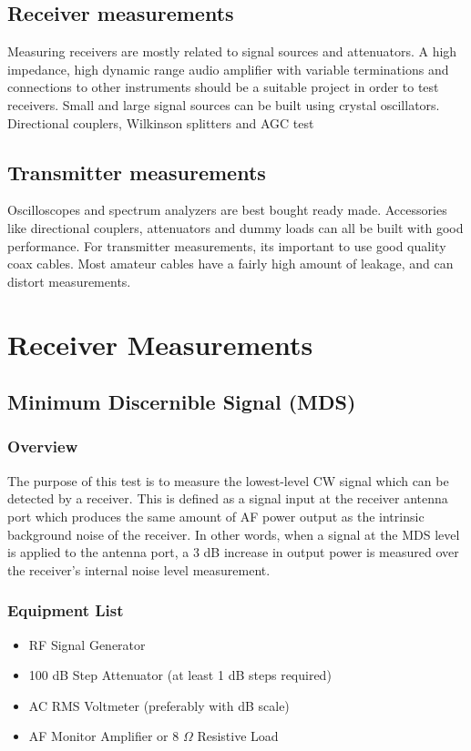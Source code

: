 \documentclass[10pt,letterpaper]{book}
\begin{document}
\section{Receiver measurements}
Measuring receivers are mostly related to signal sources and attenuators. A high impedance, high dynamic range audio amplifier with variable terminations and connections to other instruments should be a suitable project in order to test receivers. 
Small and large signal sources can be built using crystal oscillators. Directional couplers, Wilkinson splitters and AGC test %
\section{Transmitter measurements}
Oscilloscopes and spectrum analyzers are best bought ready made. Accessories like directional couplers, attenuators and dummy loads can all be built with good performance. 
For transmitter measurements, its important to use good quality coax cables. Most amateur cables have a fairly high amount of leakage, and can distort measurements.  
\chapter{Receiver Measurements}
\section{Minimum Discernible Signal (MDS)}
\subsection*{Overview}
The purpose of this test is to measure the lowest-level CW signal which can be detected by a receiver. This is defined as a signal input at the receiver antenna port which produces the same amount of AF power output as the intrinsic background noise of the receiver. In other words, when a signal at the MDS level is applied to the antenna port, a 3 dB increase in output power is measured over the receiver's internal noise level measurement.
\subsection*{Equipment List}
\begin{itemize}
	\item RF Signal Generator
	\item 100 dB Step Attenuator (at least 1 dB steps required)
	\item AC RMS Voltmeter (preferably with dB scale)
	\item AF Monitor Amplifier or 8 $\Omega$ Resistive Load
\end{itemize}
\end{document}

